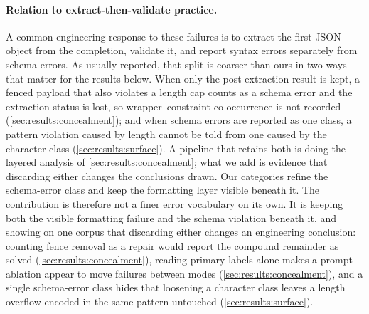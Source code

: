 \paragraph{Relation to extract-then-validate practice.}
A common engineering response to these failures is to extract the first
JSON object from the completion, validate it, and report syntax errors
separately from schema errors. As usually reported, that split is coarser than ours in two ways that matter
for the results below. When only the post-extraction result is kept, a fenced
payload that also violates a length cap counts as a schema error and the
extraction status is lost, so wrapper--constraint co-occurrence is not
recorded (\cref{sec:results:concealment}); and when schema errors are
reported as one class, a pattern violation caused by length cannot be told
from one caused by the character class (\cref{sec:results:surface}). A
pipeline that retains both is doing the layered analysis of
\cref{sec:results:concealment}; what we add is evidence that discarding
either changes the conclusions drawn.
Our categories refine the schema-error class and keep the formatting
layer visible beneath it.
The contribution is therefore not a finer error vocabulary on its own. It
is keeping both the visible formatting failure and the schema violation
beneath it, and showing on one corpus that discarding either changes an
engineering conclusion: counting fence removal as a repair would report
the compound remainder as solved (\cref{sec:results:concealment}),
reading primary labels alone makes a prompt ablation appear to move
failures between modes (\cref{sec:results:concealment}), and a single
schema-error class hides that loosening a character class leaves a
length overflow encoded in the same pattern untouched
(\cref{sec:results:surface}).
